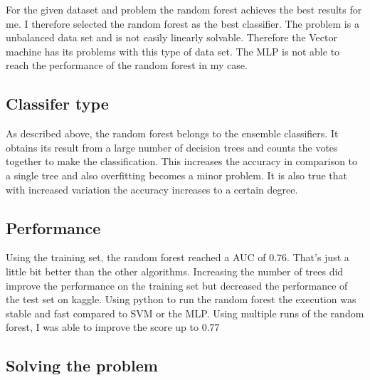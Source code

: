 For the given dataset and problem the random forest achieves the best results for me. I therefore selected the random forest as the best classifier. The problem is a unbalanced data set and is not easily linearly solvable. Therefore the Vector machine has its problems with this type of data set. The MLP is not able to reach the performance of the random forest in my case.

\subsection{Classifer type}
As described above, the random forest belongs to the ensemble classifiers. It obtains its result from a large number of decision trees and counts the votes together to make the classification. This increases the accuracy in comparison to a single tree and also overfitting becomes a minor problem. It is also true that with increased variation the accuracy increases to a certain degree.

\subsection{Performance}

Using the training set, the random forest reached a AUC of $0.76$. That's just a little bit better than the other algorithms. Increasing the number of trees did improve the performance on the training set but decreased the performance of the test set on kaggle. Using python to run the random forest the execution was stable and fast compared to SVM or the MLP. Using multiple runs of the random forest, I was able to improve the score up to $0.77$

\subsection{Solving the problem}




